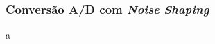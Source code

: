 \begin{frame}[allowframebreaks]
  \frametitle{Conversão A/D com \textit{Noise Shaping}}
   a
\end{frame}








